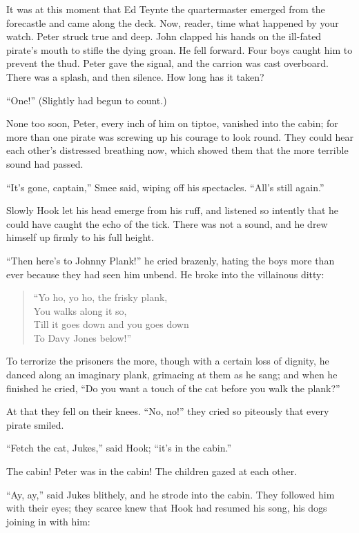 It was at this moment that Ed Teynte the quartermaster emerged from the forecastle and came along the deck.
Now, reader, time what happened by your watch.
Peter struck true and deep.
John clapped his hands on the ill-fated pirate’s mouth to stifle the dying groan.
He fell forward.
Four boys caught him to prevent the thud.
Peter gave the signal, and the carrion was cast overboard.
There was a splash, and then silence.
How long has it taken?

“One!”
(Slightly had begun to count.)

None too soon, Peter, every inch of him on tiptoe, vanished into the cabin;
for more than one pirate was screwing up his courage to look round.
They could hear each other’s distressed breathing now,
which showed them that the more terrible sound had passed.

“It’s gone, captain,” Smee said, wiping off his spectacles.
“All’s still again.”

Slowly Hook let his head emerge from his ruff,
and listened so intently that he could have caught the echo of the tick.
There was not a sound, and he drew himself up firmly to his full height.

“Then here’s to Johnny Plank!\@” he cried brazenly,
hating the boys more than ever because they had seen him unbend.
He broke into the villainous ditty:

\begin{verse}
	“Yo ho, yo ho, the frisky plank,\\
	You walks along it so,\\
	Till it goes down and you goes down\\
	To Davy Jones below!”
\end{verse}

To terrorize the prisoners the more, though with a certain loss of dignity,
he danced along an imaginary plank, grimacing at them as he sang;
and when he finished he cried, “Do you want a touch of the cat before you walk the plank?”

At that they fell on their knees.
“No, no!\@” they cried so piteously that every pirate smiled.

“Fetch the cat, Jukes,” said Hook;
“it’s in the cabin.”

The cabin!
Peter was in the cabin!
The children gazed at each other.

“Ay, ay,” said Jukes blithely, and he strode into the cabin.
They followed him with their eyes;
they scarce knew that Hook had resumed his song, his dogs joining in with him:

